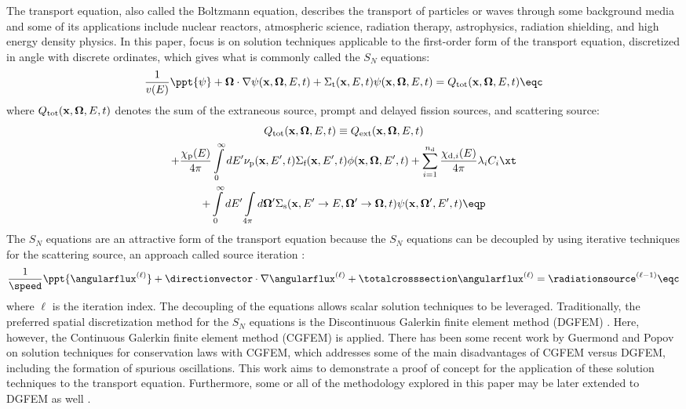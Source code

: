 The transport equation, also called the Boltzmann equation, describes the
transport of particles or waves through some background media and some
of its applications include nuclear reactors, atmospheric science, radiation
therapy, astrophysics, radiation shielding, and high energy density physics.
In this paper, focus is on solution techniques applicable to the first-order
form of the transport equation, discretized in angle with discrete ordinates,
which gives what is commonly called the $S_N$ equations:
\begin{equation}
  \frac{1}{v(E)}\ppt{\aflux} + \di\cdot\nabla\aflux\xdet
    + \totalxsec\xet\aflux\xdet = \Qtot\xdet
  \eqc
\end{equation}
where $Q_\textup{tot}(\mathbf{x},\mathbf{\Omega},E,t)$ denotes the sum of the extraneous source, prompt and delayed
fission sources, and scattering source:
\begin{multline}
  \Qtot\xdet \equiv \Qext\xdet\\
    + \frac{\chi_\text{p}(E)}{4\pi}\int\limits_0^\infty
      dE'\nu_\text{p}(\x,E',t)\fissionxsec(\x,E',t)\phi(\x,\di,E',t)
    + \sum\limits_{i=1}^{n_\text{d}}\frac{\chi_{\text{d},i}(E)}{4\pi}\lambda_i C_i\xt\\
    + \int\limits_0^\infty dE'\int\limits_{4\pi}d\di'
      \scatteringxsec(\x,E'\rightarrow E,\di'\rightarrow\di,t)\aflux(\x,\di',E',t)
  \eqp
\end{multline}
The $S_N$ equations are an attractive form of the transport equation because
the $S_N$ equations can be decoupled by using iterative techniques for the
scattering source, an approach called source iteration \cite{glasstone}:
\begin{equation}
  \frac{1}{\speed}\ppt{\angularflux^{(\ell)}}
    + \directionvector\cdot\nabla\angularflux^{(\ell)}
    + \totalcrosssection\angularflux^{(\ell)} = \radiationsource^{(\ell-1)} \eqc
\end{equation}
where $\ell$ is the iteration index. The decoupling of the equations allows
scalar solution techniques to be leveraged.
Traditionally, the preferred spatial discretization method for the $S_N$
equations is the Discontinuous Galerkin finite element method (DGFEM)
\cite{Lesaint1974}\cite{Reed_Hill_1973}. Here, however, the
Continuous Galerkin finite element method (CGFEM) is applied. There
has been some recent work by Guermond and Popov \cite{guermond_ev} on
solution techniques for conservation laws with CGFEM, which addresses some
of the main disadvantages of CGFEM versus DGFEM, including the formation
of spurious oscillations. This work aims to demonstrate a proof of concept
for the application of these solution techniques to the transport equation.
Furthermore, some or all of the methodology explored in this paper may be
later extended to DGFEM as well \cite{zingan_2013}.





